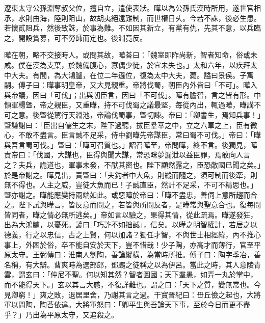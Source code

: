 \begin{pinyinscope}
遼東太守公孫淵奪叔父位，擅自立，遣使表狀。曄以為公孫氏漢時所用，遂世官相承，水則由海，陸則阻山，故胡夷絕遠難制，而世權日乆。今若不誅，後必生患。若懷貳阻兵，然後致誅，於事為難。不如因其新立，有黨有仇，先其不意，以兵臨之，開設賞募，可不勞師而定也。後淵竟反。

曄在朝，略不交接時人。或問其故，曄荅曰：「魏室即阼尚新，智者知命，俗或未咸。僕在漢為支葉，於魏備腹心，寡偶少徒，於宜未失也。」太和六年，以疾拜太中大夫。有間，為大鴻臚，在位二年遜位，復為太中大夫，薨。謚曰景侯。子㝢嗣。傅子曰：曄事明皇帝，又大見親重。帝將伐蜀，朝臣內外皆曰「不可」。曄入與帝議，因曰「可伐」；出與朝臣言，因曰「不可伐」。曄有膽智，言之皆有形。中領軍楊曁，帝之親臣，又重曄，持不可伐蜀之議最堅，每從內出，輒過曄，曄講不可之意。後曁從駕行天淵池，帝論伐蜀事，曁切諫。帝曰：「卿書生，焉知兵事！」曁謙謝曰：「臣出自儒生之末，陛下過聽，拔臣羣萃之中，立之六軍之上，臣有微心，不敢不盡言。臣言誠不足采，侍中劉曄先帝謀臣，常曰蜀不可伐。」帝曰：「曄與吾言蜀可伐。」曁曰：「曄可召質也。」詔召曄至，帝問曄，終不言。後獨見，曄責帝曰：「伐國，大謀也，臣得與聞大謀，常恐眯夢漏泄以益臣罪，焉敢向人言之？夫兵，詭道也，軍事未發，不猒其密也。陛下顯然露之，臣恐敵國已聞之矣。」於是帝謝之。曄見出，責曁曰：「夫釣者中大魚，則縱而隨之，須可制而後牽，則無不得也。人主之威，豈徒大魚而已！子誠直臣，然計不足采，不可不精思也。」曁亦謝之。曄能應變持兩端如此。或惡曄於帝曰：「曄不盡忠，善伺上意所趨而合之。陛下試與曄言，皆反意而問之，若皆與所問反者，是曄常與聖意合也。復每問皆同者，曄之情必無所逃矣。」帝如言以驗之，果得其情，從此疏焉。曄遂發狂，出為大鴻臚，以憂死。諺曰「巧詐不如拙誠」，信矣。以曄之明智權計，若居之以德義，行之以忠信，古之上賢，何以加諸？獨任才智，不與世士相經緯，內不推心事上，外困於俗，卒不能自安於天下，豈不惜哉！少子陶，亦高才而薄行，官至平原太守。王弼傳曰：淮南人劉陶，善論縱橫，為當時所推。傅子曰：陶字季冶，善名稱，有大辯。曹爽時為選部郎，鄧颺之徒稱之以為伊呂。當此之時，其人意陵青雲，謂玄曰：「仲尼不聖。何以知其然？智者圖國；天下羣愚，如弄一丸於掌中，而不能得天下。」玄以其言大惑，不復詳難也。謂之曰：「天下之質，變無常也。今見卿窮！」爽之敗，退居里舍，乃謝其言之過。干寶晉紀曰：毌丘儉之起也，大將軍以問陶，陶荅依違。大將軍怒曰：「卿平生與吾論天下事，至於今日而更不盡乎？」乃出為平原太守，又追殺之。


\end{pinyinscope}